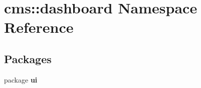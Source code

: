 \section{cms\-:\-:dashboard \-Namespace \-Reference}
\label{namespacecms_1_1dashboard}
\subsection*{\-Packages}
\begin{DoxyCompactItemize}
\item 
package {\bf ui}
\end{DoxyCompactItemize}
